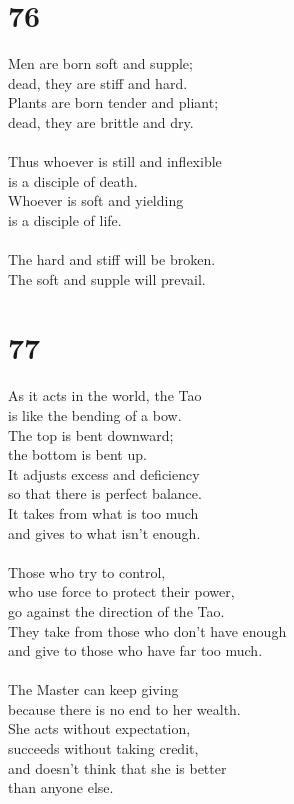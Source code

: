 \documentclass[b5paper, 12pt, oneside]{book}
\begin{document}
\chapter*{76}
Men are born soft and supple;\\
dead, they are stiff and hard.\\
Plants are born tender and pliant;\\
dead, they are brittle and dry.\\
\\
Thus whoever is still and inflexible\\
is a disciple of death.\\
Whoever is soft and yielding\\
is a disciple of life.\\
\\
The hard and stiff will be broken.\\
The soft and supple will prevail.

\chapter*{77}
As it acts in the world, the Tao\\
is like the bending of a bow.\\
The top is bent downward;\\
the bottom is bent up.\\
It adjusts excess and deficiency\\
so that there is perfect balance.\\
It takes from what is too much\\
and gives to what isn't enough.\\
\\
Those who try to control,\\
who use force to protect their power,\\
go against the direction of the Tao.\\
They take from those who don't have enough\\
and give to those who have far too much.\\
\\
The Master can keep giving\\
because there is no end to her wealth.\\
She acts without expectation,\\
succeeds without taking credit,\\
and doesn't think that she is better\\
than anyone else.
\end{document}
